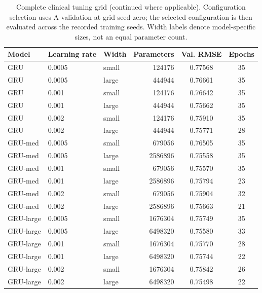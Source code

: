 \clearpage
\begin{table}[tbp]
\centering
\caption{Complete clinical tuning grid (continued where applicable). Configuration selection uses A-validation at grid seed zero; the selected configuration is then evaluated across the recorded training seeds. Width labels denote model-specific sizes, not an equal parameter count.}\label{tab:grid0}
\small\setlength{\tabcolsep}{4pt}
\begin{tabular}{lllrcc}
\toprule
Model 
& Learning rate 
& Width 
& Parameters 
& Val. RMSE 
& Epochs 
\\
\midrule
GRU 
& 0.0005 
& small 
& 124176 
& 0.77568 
& 35 
\\
GRU 
& 0.0005 
& large 
& 444944 
& 0.76661 
& 35 
\\
GRU 
& 0.001 
& small 
& 124176 
& 0.76642 
& 35 
\\
GRU 
& 0.001 
& large 
& 444944 
& 0.75662 
& 35 
\\
GRU 
& 0.002 
& small 
& 124176 
& 0.75910 
& 35 
\\
GRU 
& 0.002 
& large 
& 444944 
& 0.75771 
& 28 
\\
GRU-med 
& 0.0005 
& small 
& 679056 
& 0.76505 
& 35 
\\
GRU-med 
& 0.0005 
& large 
& 2586896 
& 0.75558 
& 35 
\\
GRU-med 
& 0.001 
& small 
& 679056 
& 0.75570 
& 35 
\\
GRU-med 
& 0.001 
& large 
& 2586896 
& 0.75794 
& 23 
\\
GRU-med 
& 0.002 
& small 
& 679056 
& 0.75904 
& 32 
\\
GRU-med 
& 0.002 
& large 
& 2586896 
& 0.75663 
& 21 
\\
GRU-large 
& 0.0005 
& small 
& 1676304 
& 0.75749 
& 35 
\\
GRU-large 
& 0.0005 
& large 
& 6498320 
& 0.75580 
& 33 
\\
GRU-large 
& 0.001 
& small 
& 1676304 
& 0.75770 
& 28 
\\
GRU-large 
& 0.001 
& large 
& 6498320 
& 0.75744 
& 22 
\\
GRU-large 
& 0.002 
& small 
& 1676304 
& 0.75842 
& 26 
\\
GRU-large 
& 0.002 
& large 
& 6498320 
& 0.75498 
& 22 
\\
\bottomrule
\end{tabular}
\end{table}

